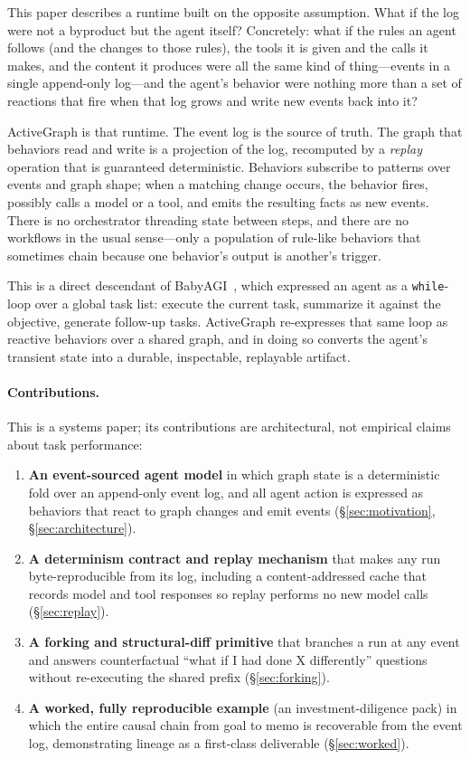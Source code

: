 \documentclass[11pt]{article}
\begin{document}
This paper describes a runtime built on the opposite assumption. What if the log
were not a byproduct but the agent itself? Concretely: what if the rules an agent
follows (and the changes to those rules), the tools it is given and the calls it
makes, and the content it produces were all the same kind of thing---events in a
single append-only log---and the agent's behavior were nothing more than a set of
reactions that fire when that log grows and write new events back into it?

ActiveGraph is that runtime. The event log is the source of truth. The graph that
behaviors read and write is a projection of the log, recomputed by a
\emph{replay} operation that is guaranteed deterministic. Behaviors subscribe to
patterns over events and graph shape; when a matching change occurs, the behavior
fires, possibly calls a model or a tool, and emits the resulting facts as new
events. There is no orchestrator threading state between steps, and there are no
workflows in the usual sense---only a population of rule-like behaviors that
sometimes chain because one behavior's output is another's trigger.

This is a direct descendant of BabyAGI~\cite{babyagi}, which expressed an agent as
a \texttt{while}-loop over a global task list: execute the current task,
summarize it against the objective, generate follow-up tasks. ActiveGraph
re-expresses that same loop as reactive behaviors over a shared graph, and in
doing so converts the agent's transient state into a durable, inspectable,
replayable artifact.

\paragraph{Contributions.} This is a systems paper; its contributions are
architectural, not empirical claims about task performance:

\begin{enumerate}[leftmargin=1.4em,itemsep=2pt]
  \item \textbf{An event-sourced agent model} in which graph state is a
  deterministic fold over an append-only event log, and all agent action is
  expressed as behaviors that react to graph changes and emit events
  (\S\ref{sec:motivation}, \S\ref{sec:architecture}).
  \item \textbf{A determinism contract and replay mechanism} that makes any run
  byte-reproducible from its log, including a content-addressed cache that records
  model and tool responses so replay performs no new model calls
  (\S\ref{sec:replay}).
  \item \textbf{A forking and structural-diff primitive} that branches a run at
  any event and answers counterfactual ``what if I had done X differently''
  questions without re-executing the shared prefix (\S\ref{sec:forking}).
  \item \textbf{A worked, fully reproducible example} (an investment-diligence
  pack) in which the entire causal chain from goal to memo is recoverable from
  the event log, demonstrating lineage as a first-class deliverable
  (\S\ref{sec:worked}).
\end{enumerate}
\end{document}
